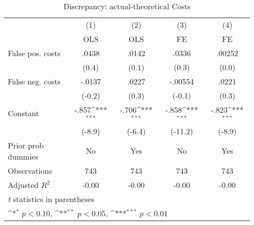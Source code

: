\begin{table}[htbp]\centering
\def\sym#1{\ifmmode^{#1}\else\(^{#1}\)\fi}
\caption{Discrepancy: actual-theoretical Costs}
\begin{tabular}{l*{4}{c}}
\hline\hline
                &\multicolumn{1}{c}{(1)}&\multicolumn{1}{c}{(2)}&\multicolumn{1}{c}{(3)}&\multicolumn{1}{c}{(4)}\\
                &\multicolumn{1}{c}{OLS}&\multicolumn{1}{c}{OLS}&\multicolumn{1}{c}{FE}&\multicolumn{1}{c}{FE}\\
\hline
False pos. costs&    .0438         &    .0142         &    .0336         &   .00252         \\
                &    (0.4)         &    (0.1)         &    (0.3)         &    (0.0)         \\
False neg. costs&   -.0137         &    .0227         &  -.00554         &    .0221         \\
                &   (-0.2)         &    (0.3)         &   (-0.1)         &    (0.3)         \\
Constant        &    -.857\sym{***}&    -.706\sym{***}&    -.858\sym{***}&    -.823\sym{***}\\
                &   (-8.9)         &   (-6.4)         &  (-11.2)         &   (-8.9)         \\
Prior prob dummies &       No         &      Yes         &       No         &      Yes         \\
\hline
Observations    &      743         &      743         &      743         &      743         \\
Adjusted \(R^{2}\)&    -0.00         &    -0.00         &    -0.00         &    -0.00         \\
\hline\hline
\multicolumn{5}{l}{\footnotesize \textit{t} statistics in parentheses}\\
\multicolumn{5}{l}{\footnotesize \sym{*} \(p<0.10\), \sym{**} \(p<0.05\), \sym{***} \(p<0.01\)}\\
\end{tabular}
\end{table}
